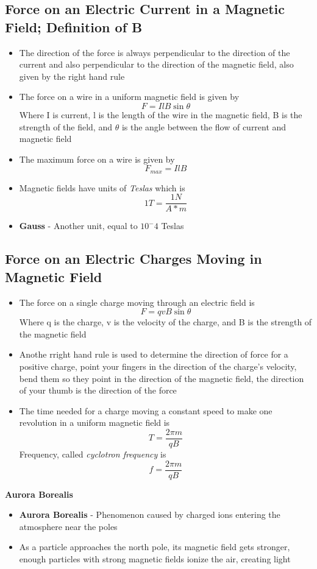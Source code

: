 \subsection{Force on an Electric Current in a Magnetic Field; Definition of \textbf{B}}
\begin{itemize}
    \item The direction of the force is always perpendicular to the direction of the current and also perpendicular to the direction of the magnetic field, also given by the right hand rule
    \item The force on a wire in a uniform magnetic field is given by \[F=IlB\sin\theta\] Where I is current, l is the length of the wire in the magnetic field, B is the strength of the field, and \(\theta\) is the angle between the flow of current and magnetic field
    \item The maximum force on a wire is given by \[F_{max}=IlB\]
    \item Magnetic fields have units of \emph{Teslas} which is \[1T=\frac{1N}{A*m}\]
    \item \textbf{Gauss} - Another unit, equal to \(10^-4\) Teslas
\end{itemize}

\subsection{Force on an Electric Charges Moving in Magnetic Field}
\begin{itemize}
    \item The force on a single charge moving through an electric field is \[F=qvB\sin\theta\] Where q is the charge, v is the velocity of the charge, and B is the strength of the magnetic field
    \item Anothe rright hand rule is used to determine the direction of force for a positive charge, point your fingers in the direction of the charge's velocity, bend them so they point in the direction of the magnetic field, the direction of your thumb is the direction of the force
    \item The time needed for a charge moving a constant speed to make one revolution in a uniform magnetic field is \[T=\frac{2\pi m}{qB}\] Frequency, called \emph{cyclotron frequency} is \[f=\frac{2\pi m}{qB}\]
\end{itemize}

\textbf{Aurora Borealis}
\begin{itemize}
    \item \textbf{Aurora Borealis} - Phenomenon caused by charged ions entering the atmosphere near the poles
    \item As a particle approaches the north pole, its magnetic field gets stronger, enough particles with strong magnetic fields ionize the air, creating light
\end{itemize}

